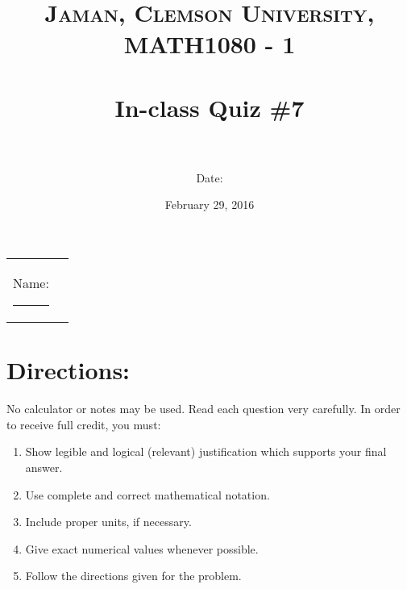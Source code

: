 \documentclass[paper=a4, fontsize=11pt]{scrartcl} %
\title{	
\normalfont \normalsize 
\textsc{Jaman, Clemson University, MATH1080 - 1} \\ [25pt] %
\horrule{0.5pt} \\[0.4cm] %
\huge In-class Quiz \#7 \\ %
\horrule{2pt} \\[0.5cm] %
}
\author{Date:} %
\date{\normalsize February 29, 2016} %
\numberwithin{equation}{section} %
\numberwithin{figure}{section} %
\numberwithin{table}{section} %
\begin{document}
\maketitle %

\begin{flushleft}
\begin{tabular}{l l}
Name: \rule{3.2in}{.01cm}  & {}%
\end{tabular}
\end{flushleft}


\section*{\textbf{Directions:}}

No calculator or notes may be used.  Read each question very carefully.  In order to receive full credit, you must:
\begin{enumerate}
\item Show legible and logical (relevant) justification which supports your final answer.
\item Use complete and correct mathematical notation.
\item Include proper units, if necessary.
\item Give exact numerical values whenever possible.
\item Follow the directions given for the problem.
\end{enumerate}
\vspace{.1in}

\newpage
\end{document}
